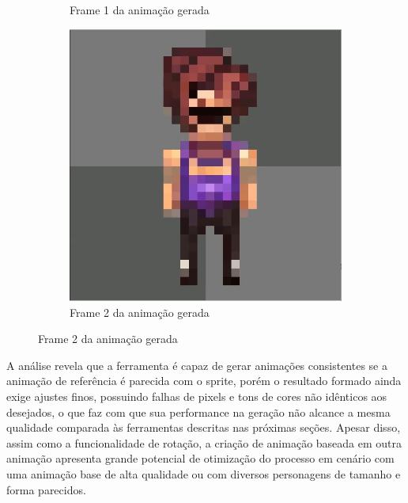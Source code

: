 \begin{figure}[htbp]
\begin{subfigure}{0.32\linewidth}
        \caption{\small Frame 1 da animação gerada }
        \label{fig:pixelLabAnimaComparaRodarFrame1}
    \end{subfigure}
    \begin{subfigure}{0.32\linewidth}
        \includegraphics[width=1\linewidth]{figs/pixelLab/dia4/printB.PNG}
        \caption{\small Frame 2 da animação gerada  }
        \label{fig:pixelLabAnimaComparaRodarFrame2}
    \end{subfigure}
\end{figure}

A análise revela que a ferramenta é capaz de gerar animações consistentes se a animação de referência é parecida com o sprite, porém o resultado formado ainda exige ajustes finos, possuindo falhas de pixels e tons de cores não idênticos aos desejados, o que faz com que sua performance na geração não alcance a mesma qualidade comparada às ferramentas descritas nas próximas seções. Apesar disso, assim como a funcionalidade de rotação, a criação de animação baseada em outra animação apresenta grande potencial de otimização do processo em cenário com uma animação base de alta qualidade ou com diversos personagens de tamanho e forma parecidos.

